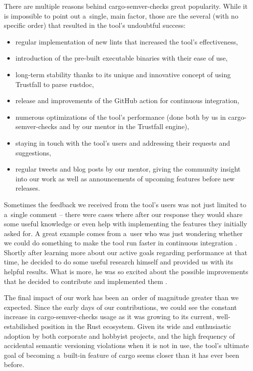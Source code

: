\documentclass[licencjacka,en]{pracamgr}
\begin{document}
There are multiple reasons behind cargo-semver-checks great popularity. While it
is impossible to point out a~single, main factor, those are the several (with no specific order) that
resulted in the tool's undoubtful success:
\begin{itemize}
	\item regular implementation of new lints that increased the tool's effectiveness,
	\item introduction of the pre-built executable binaries with their ease of use,
	\item long-term stability thanks to its unique and innovative concept of using Trustfall
		to parse rustdoc,
	\item release and improvements of the GitHub action for continuous integration,
	\item numerous optimizations of the tool's performance (done both by us in
		cargo-semver-checks and by our mentor in the Trustfall engine),
	\item staying in touch with the tool's users and addressing their requests and suggestions,
	\item regular tweets and blog posts by our mentor, giving the community insight into our work
		as well as announcements of upcoming features before new releases.
\end{itemize}

Sometimes the feedback we received from the tool's users was not just limited to a~single comment
-- there were cases where after our response they would share some useful
knowledge or even help with implementing the features they initially asked for. A great example
comes from a~user who was just wondering whether we could do something to make the tool run faster
in continuous integration \cite{make-ci-runs-faster}. Shortly after learning more about our active
goals regarding performance at that time, he decided to do some useful research himself
and provided us with its helpful results. What is more, he was so excited about the possible
improvements that he decided to contribute and implemented them \cite{user-contribution-1}.

The final impact of our work has been an~order of magnitude greater than we expected.
Since the early days of our contributions, we could see the constant increase
in cargo-semver-checks usage as it was growing to its current, well-estabilished position in
the Rust ecosystem. Given its wide and enthusiastic adoption by both corporate and hobbyist
projects, and the high frequency of accidental semantic versioning violations when it is not
in use, the tool's ultimate goal of becoming a~built-in feature of cargo seems closer than it has
ever been before.
\end{document}
